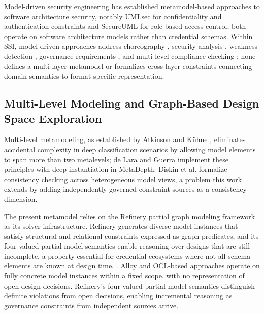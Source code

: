 Model-driven security engineering has established metamodel-based approaches to software architecture security, notably UMLsec \citep{noauthor_secure_2005} for confidentiality and authentication constraints and SecureUML \citep{basin_model_2006} for role-based access control; both operate on software architecture models rather than credential schemas. Within SSI, model-driven approaches address choreography \citep{cippitelli_chorssi_2024}, security analysis \citep{ding_model-driven_2023}, weakness detection \citep{pattiyanonMethodDetectingCommon2022}, governance requirements \citep{barclay_towards_2020}, and multi-level compliance checking \citep{king_automated_2017}; none defines a multi-layer metamodel or formalizes cross-layer constraints connecting domain semantics to format-specific representation.

\subsection{Multi-Level Modeling and Graph-Based Design Space Exploration}\label{sec:rw-multilevel}

Multi-level metamodeling, as established by Atkinson and Kühne \citep{goos_essence_2001, atkinson_reducing_2008}, eliminates accidental complexity in deep classification scenarios by allowing model elements to span more than two metalevels; de Lara and Guerra \citep{hutchison_deep_2010} implement these principles with deep instantiation in MetaDepth. Diskin et al. \citep{dingel_specifying_2011} formalize consistency checking across heterogeneous model views, a problem this work extends by adding independently governed constraint sources as a consistency dimension.

The present metamodel relies on the Refinery partial graph modeling framework \citep{marussy_refinery_2024} as its solver infrastructure. Refinery generates diverse model instances that satisfy structural and relational constraints expressed as graph predicates, and its four-valued partial model semantics enable reasoning over designs that are still incomplete, a property essential for credential ecosystems where not all schema elements are known at design time. .
Alloy \citep{jackson_software_2012} and OCL-based approaches operate on fully concrete model instances within a fixed scope, with no representation of open design decisions. Refinery's four-valued partial model semantics distinguish definite violations from open decisions, enabling incremental reasoning as governance constraints from independent sources arrive.

